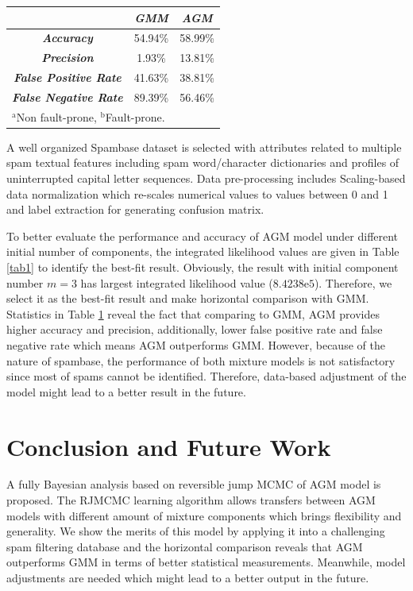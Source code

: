 \documentclass[conference]{IEEEtran}
\begin{document}
\begin{table}[b]
\begin{center}
\begin{tabular}{|c|c|c|}
\hline
 & \multicolumn{1}{|p{1.5cm}|}{\centering \textbf{\textit{GMM}}} & \multicolumn{1}{|p{1.5cm}|}{\centering \textbf{\textit{AGM}}}\\
\hline
\multicolumn{1}{|p{2.5cm}|}{\centering \textbf{\textit{Accuracy}}}  & 54.94\% & 58.99\%\\
\multicolumn{1}{|p{2.5cm}|}{\centering \textbf{\textit{Precision}}} & 1.93\% & 13.81\%\\
\multicolumn{1}{|p{2.5cm}|}{\centering \textbf{\textit{False Positive Rate}}}  & 41.63\% & 38.81\%\\
\multicolumn{1}{|p{2.5cm}|}{\centering \textbf{\textit{False Negative Rate}}} & 89.39\% & 56.46\%\\
\hline
\multicolumn{3}{l}{$^{\mathrm{a}}$Non fault-prone, $^{\mathrm{b}}$Fault-prone.}
\end{tabular}
\end{center}
\label{tab2}
\end{table}

A well organized Spambase dataset\cite{spambase} is selected with attributes related to multiple spam textual features including spam word/character dictionaries and profiles of uninterrupted capital letter sequences. Data pre-processing includes Scaling-based data normalization which re-scales numerical values to values between 0 and 1 and label extraction for generating confusion matrix. 

To better evaluate the performance and accuracy of AGM model under different initial number of components, the integrated likelihood\cite{b4} values are given in Table \ref{tab1} to identify the best-fit result. Obviously, the result with initial component number $m=3$ has largest integrated likelihood value ($8.4238\mathrm{e}{5}$). Therefore, we select it as the best-fit result and make horizontal comparison with GMM. Statistics in Table \ref{tab2} reveal the fact that comparing to GMM, AGM provides higher accuracy and precision, additionally, lower false positive rate and false negative rate which means AGM outperforms GMM. However, because of the nature of spambase, the performance of both mixture models is not satisfactory since most of spams cannot be identified. Therefore, data-based adjustment of the model might lead to a better result in the future. 

\section{Conclusion and Future Work}
A fully Bayesian analysis based on reversible jump MCMC of AGM model is proposed. The RJMCMC learning algorithm allows transfers between AGM models with different amount of mixture components which brings flexibility and generality. We show the merits of this model by applying it into a challenging spam filtering database and the horizontal comparison reveals that AGM outperforms GMM in terms of better statistical measurements. Meanwhile, model adjustments are needed which might lead to a better output in the future.
\end{document}
